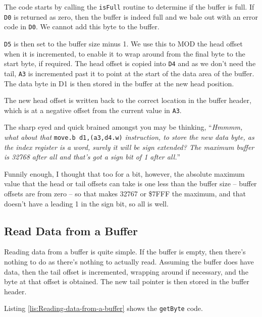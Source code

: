 The code starts by calling the \texttt{isFull} routine to determine
if the buffer is full. If \texttt{D0} is returned as zero, then the
buffer is indeed full and we bale out with an error code in \texttt{D0}.
We cannot add this byte to the buffer.

\texttt{D5} is then set to the buffer size minus 1. We use this to
MOD the head offset when it is incremented, to enable it to wrap around
from the final byte to the start byte, if required. The head offset
is copied into \texttt{D4} and as we don't need the tail, \texttt{A3}
is incremented past it to point at the start of the data area of the
buffer. The data byte in D1 is then stored in the buffer at the new
head position.

The new head offset is written back to the correct location in the
buffer header, which is at a negative offset from the current value
in \texttt{A3}.

The sharp eyed and quick brained amongst you may be thinking, ``\emph{Hmmmm,
what about that }\lstinline!move.b d1,(a3,d4.w)!\emph{ instruction,
to store the new data byte, as the index register is a word, surely
it will be sign extended? The maximum buffer is 32768 after all and
that's got a sign bit of 1 after all.}''

Funnily enough, I thought that too for a bit, however, the absolute
maximum value that the head or tail offsets can take is one less than
the buffer size -- buffer offsets are from zero -- so that makes
32767 or \$7FFF the maximum, and that doesn't have a leading 1 in
the sign bit, so all is well.

\subsection{Read Data from a Buffer}

Reading data from a buffer is quite simple. If the buffer is empty,
then there's nothing to do as there's nothing to actually read. Assuming
the buffer does have data, then the tail offset is incremented, wrapping
around if necessary, and the byte at that offset is obtained. The
new tail pointer is then stored in the buffer header.

Listing \ref{lis:Reading-data-from-a-buffer} shows the \texttt{getByte}
code.

